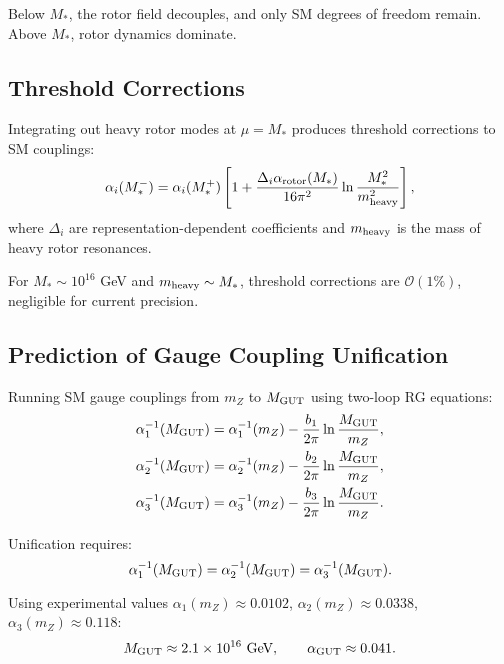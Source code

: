 \documentclass[11pt,a4paper]{article}
\numberwithin{equation}{section}
\theoremstyle{plain}
\theoremstyle{definition}
\theoremstyle{remark}
\begin{document}
Below $M_*$, the rotor field decouples, and only SM degrees of freedom remain. Above $M_*$, rotor dynamics dominate.

\subsection{Threshold Corrections}

Integrating out heavy rotor modes at $\mu=M_*$ produces threshold corrections to SM couplings:
\begin{equation}
\alpha_i(M_*^-) = \alpha_i(M_*^+)\left[1 + \frac{\Delta_i\alpha_{\rm rotor}(M_*)}{16\pi^2}\ln\frac{M_*^2}{m_{\rm heavy}^2}\right],
\label{eq:threshold}
\end{equation}
where $\Delta_i$ are representation-dependent coefficients and $m_{\rm heavy}$ is the mass of heavy rotor resonances.

For $M_* \sim 10^{16}$ GeV and $m_{\rm heavy}\sim M_*$, threshold corrections are $\mathcal{O}(1\%)$, negligible for current precision.

\subsection{Prediction of Gauge Coupling Unification}

Running SM gauge couplings from $m_Z$ to $M_{\rm GUT}$ using two-loop RG equations:
\begin{align}
\alpha_1^{-1}(M_{\rm GUT}) &= \alpha_1^{-1}(m_Z) - \frac{b_1}{2\pi}\ln\frac{M_{\rm GUT}}{m_Z}, \notag\\
\alpha_2^{-1}(M_{\rm GUT}) &= \alpha_2^{-1}(m_Z) - \frac{b_2}{2\pi}\ln\frac{M_{\rm GUT}}{m_Z}, \notag\\
\alpha_3^{-1}(M_{\rm GUT}) &= \alpha_3^{-1}(m_Z) - \frac{b_3}{2\pi}\ln\frac{M_{\rm GUT}}{m_Z}.
\label{eq:RG-SM-running}
\end{align}

Unification requires:
\begin{equation}
\alpha_1^{-1}(M_{\rm GUT}) = \alpha_2^{-1}(M_{\rm GUT}) = \alpha_3^{-1}(M_{\rm GUT}).
\label{eq:unification-condition}
\end{equation}

Using experimental values $\alpha_1(m_Z)\approx 0.0102$, $\alpha_2(m_Z)\approx 0.0338$, $\alpha_3(m_Z)\approx 0.118$:
\begin{equation}
M_{\rm GUT} \approx 2.1\times 10^{16}\text{ GeV}, \qquad \alpha_{\rm GUT}\approx 0.041.
\label{eq:GUT-prediction}
\end{equation}
\end{document}
